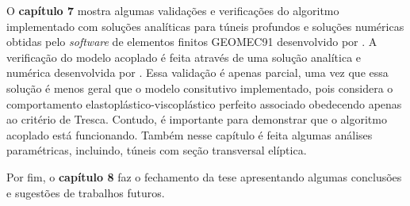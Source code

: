 O \textbf{capítulo 7} mostra algumas validações e verificações do algoritmo implementado com soluções analíticas para túneis profundos e soluções numéricas obtidas pelo \textit{software} de elementos finitos GEOMEC91 desenvolvido por . A verificação do modelo acoplado é feita através de uma solução analítica e numérica desenvolvida por . Essa validação é apenas parcial, uma vez que essa solução é menos geral que o modelo consitutivo implementado, pois considera o comportamento elastoplástico-viscoplástico perfeito associado obedecendo apenas ao critério de Tresca. Contudo, é importante para demonstrar que o algoritmo acoplado está funcionando. Também nesse capítulo é feita algumas análises paramétricas, incluindo, túneis com seção transversal elíptica.

Por fim, o \textbf{capítulo 8} faz o fechamento da tese apresentando algumas conclusões e sugestões de trabalhos futuros.


 

